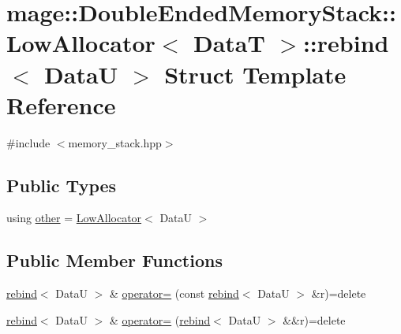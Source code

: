 \hypertarget{structmage_1_1_double_ended_memory_stack_1_1_low_allocator_1_1rebind}{}\section{mage\+:\+:Double\+Ended\+Memory\+Stack\+:\+:Low\+Allocator$<$ DataT $>$\+:\+:rebind$<$ DataU $>$ Struct Template Reference}
\label{structmage_1_1_double_ended_memory_stack_1_1_low_allocator_1_1rebind}


{\ttfamily \#include $<$memory\+\_\+stack.\+hpp$>$}

\subsection*{Public Types}
\begin{DoxyCompactItemize}
\item 
using \hyperlink{structmage_1_1_double_ended_memory_stack_1_1_low_allocator_1_1rebind_ad2d30609df172b2f8759819439a41bfd}{other} = \hyperlink{structmage_1_1_double_ended_memory_stack_1_1_low_allocator}{Low\+Allocator}$<$ DataU $>$
\end{DoxyCompactItemize}
\subsection*{Public Member Functions}
\begin{DoxyCompactItemize}
\item 
\hyperlink{structmage_1_1_double_ended_memory_stack_1_1_low_allocator_1_1rebind}{rebind}$<$ DataU $>$ \& \hyperlink{structmage_1_1_double_ended_memory_stack_1_1_low_allocator_1_1rebind_ad9015378ce09c362a25fd0a7d1b3eda5}{operator=} (const \hyperlink{structmage_1_1_double_ended_memory_stack_1_1_low_allocator_1_1rebind}{rebind}$<$ DataU $>$ \&r)=delete
\item 
\hyperlink{structmage_1_1_double_ended_memory_stack_1_1_low_allocator_1_1rebind}{rebind}$<$ DataU $>$ \& \hyperlink{structmage_1_1_double_ended_memory_stack_1_1_low_allocator_1_1rebind_a9ccd16e84aa36e483d813ca7ffdc6898}{operator=} (\hyperlink{structmage_1_1_double_ended_memory_stack_1_1_low_allocator_1_1rebind}{rebind}$<$ DataU $>$ \&\&r)=delete
\end{DoxyCompactItemize}
